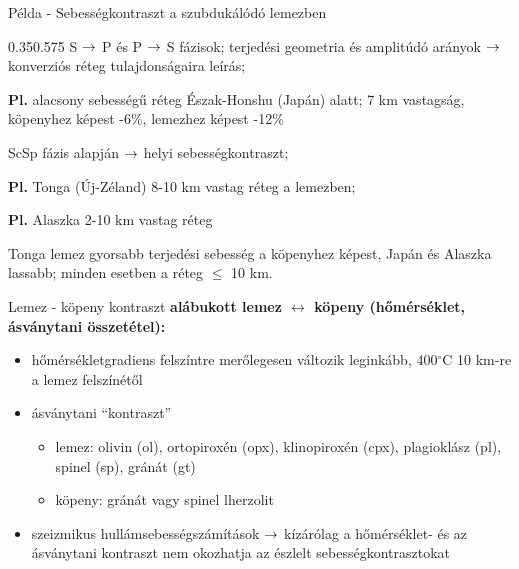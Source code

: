 
\begin{frame}{Példa - Sebességkontraszt a szubdukálódó lemezben}
    \begin{figp}{}{}{0.35}{0.575}
        S $\rightarrow$ P és P $\rightarrow$ S fázisok; terjedési geometria és amplitúdó arányok $\rightarrow$ konverziós réteg tulajdonságaira leírás;
        \vspace{5pt}
        
        \textbf{Pl.} alacsony sebességű réteg Észak-Honshu (Japán) alatt; 7 km vastagság, köpenyhez képest -6\%, lemezhez képest -12\%
        \vspace{20pt}
        
        ScSp fázis alapján $\rightarrow$ helyi sebességkontraszt;
        \vspace{5pt}
        
        \textbf{Pl.} Tonga (Új-Zéland) 8-10 km vastag réteg a lemezben;
        
        \textbf{Pl.} Alaszka 2-10 km vastag réteg
        \vspace{10pt}
        
        Tonga lemez gyorsabb terjedési sebesség a köpenyhez képest, Japán és Alaszka lassabb; minden esetben a réteg $\le$ 10 km.
    \end{figp}
\end{frame}


\begin{frame}{Lemez - köpeny kontraszt}
    \textbf{alábukott lemez $\leftrightarrow$ köpeny (hőmérséklet, ásványtani összetétel):}
    \begin{itemize}
        \item hőmérsékletgradiens felszíntre merőlegesen változik leginkább, 400$^\circ$C 10 km-re a lemez felszínétől
        \item ásványtani ``kontraszt''
        \begin{itemize}
            \item lemez: olivin (ol), ortopiroxén (opx), klinopiroxén (cpx), plagioklász (pl), spinel (sp), gránát (gt)
            \item köpeny: gránát vagy spinel lherzolit
        \end{itemize}
        \item szeizmikus hullámsebességszámítások $\rightarrow$ kízárólag a hőmérséklet- és az ásványtani kontraszt nem okozhatja az észlelt sebességkontrasztokat
    \end{itemize}
\end{frame}


